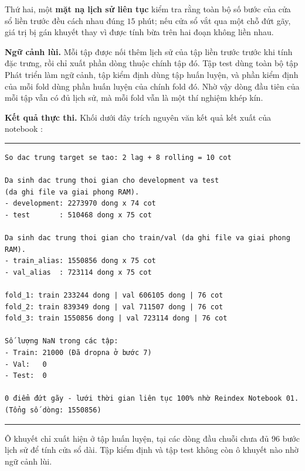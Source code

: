 \documentclass[12pt,a4paper]{article}
\DeclareRobustCommand{\tep}[1]{\texttt{\detokenize{#1}}}
\renewcommand{\baselinestretch}{1.35}
\begin{document}
Thứ hai, một \textbf{mặt nạ lịch sử liên tục} kiểm tra rằng toàn bộ số bước của cửa sổ liền
trước đều cách nhau đúng $15$ phút; nếu cửa sổ vắt qua một chỗ đứt gãy, giá trị bị gán khuyết
thay vì được tính bừa trên hai đoạn không liền nhau.

\textbf{Ngữ cảnh lùi.} Mỗi tập được nối thêm lịch sử của tập liền trước trước khi tính đặc
trưng, rồi chỉ xuất phần dòng thuộc chính tập đó. Tập test dùng toàn bộ tập Phát triển làm
ngữ cảnh, tập kiểm định dùng tập huấn luyện, và phần kiểm định của mỗi fold dùng phần huấn
luyện của chính fold đó. Nhờ vậy dòng đầu tiên của mỗi tập vẫn có đủ lịch sử, mà mỗi fold vẫn
là một thí nghiệm khép kín.

\textbf{Kết quả thực thi.} Khối dưới đây trích nguyên văn kết quả kết xuất của notebook
\tep{03_1_features_time}:

\begingroup
\par\vspace{6pt}\hrule\vspace{4pt}
\small\renewcommand{\baselinestretch}{1.0}\selectfont
\begin{verbatim}
So dac trung target se tao: 2 lag + 8 rolling = 10 cot

Da sinh dac trung thoi gian cho development va test
(da ghi file va giai phong RAM).
- development: 2273970 dong x 74 cot
- test       : 510468 dong x 75 cot

Da sinh dac trung thoi gian cho train/val (da ghi file va giai phong RAM).
- train_alias: 1550856 dong x 75 cot
- val_alias  : 723114 dong x 75 cot

fold_1: train 233244 dong | val 606105 dong | 76 cot
fold_2: train 839349 dong | val 711507 dong | 76 cot
fold_3: train 1550856 dong | val 723114 dong | 76 cot

Số lượng NaN trong các tập:
- Train: 21000 (Đã dropna ở bước 7)
- Val:   0
- Test:  0

0 điểm đứt gãy - lưới thời gian liên tục 100% nhờ Reindex Notebook 01.
(Tổng số dòng: 1550856)
\end{verbatim}
\vspace{2pt}\hrule\par\vspace{6pt}
\endgroup

Ô khuyết chỉ xuất hiện ở tập huấn luyện, tại các dòng đầu chuỗi chưa đủ $96$ bước lịch sử
để tính cửa sổ dài. Tập kiểm định và tập test không còn ô khuyết nào nhờ ngữ cảnh lùi.
\end{document}

